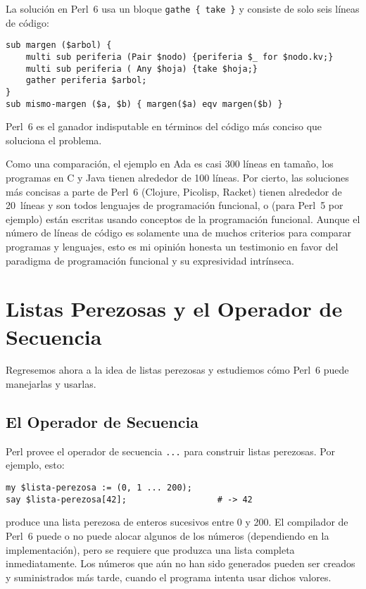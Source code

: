 La solución en Perl~6 usa un bloque \verb|gathe { take }|
y consiste de solo seis líneas de código:

\begin{verbatim}
sub margen ($arbol) {
    multi sub periferia (Pair $nodo) {periferia $_ for $nodo.kv;}
    multi sub periferia ( Any $hoja) {take $hoja;}
    gather periferia $arbol;
}
sub mismo-margen ($a, $b) { margen($a) eqv margen($b) }
\end{verbatim}


Perl~6 es el ganador indisputable en términos del código más
conciso que soluciona el problema.

Como una comparación, el ejemplo en Ada es casi 300 líneas en 
tamaño, los programas en C y Java tienen alrededor de 100 líneas. 
Por cierto, las soluciones más concisas a parte de Perl~6
(Clojure, Picolisp, Racket) tienen alrededor de 20~líneas y son
todos lenguajes de programación funcional, o (para Perl~5 por ejemplo)
están escritas usando conceptos de la programación funcional.
Aunque el número de líneas de código es solamente una de muchos
criterios para comparar programas y lenguajes, esto es mi opinión
honesta un testimonio en favor del paradigma de programación 
funcional y su expresividad intrínseca.


\section{Listas Perezosas y el Operador de Secuencia}

Regresemos ahora a la idea de listas perezosas y estudiemos 
cómo Perl~6 puede manejarlas y usarlas.

\subsection{El Operador de Secuencia}


Perl provee el operador de secuencia \verb|...| para construir
listas perezosas. Por ejemplo, esto:

\begin{verbatim}
my $lista-perezosa := (0, 1 ... 200);
say $lista-perezosa[42];                  # -> 42
\end{verbatim}

produce una lista perezosa de enteros sucesivos entre 0 y 200.
El compilador de Perl~6 puede o no puede alocar algunos de los 
números (dependiendo en la implementación), pero se requiere que 
produzca una lista completa inmediatamente. Los números que aún no han
sido generados pueden ser creados y suministrados más tarde, cuando 
el programa intenta usar dichos valores.

